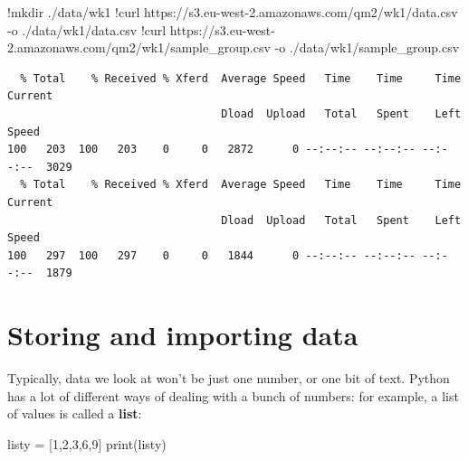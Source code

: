 \documentclass[
  letterpaper,
  DIV=11,
  numbers=noendperiod]{scrreprt}
\newenvironment{Shaded}{\begin{snugshade}}{\end{snugshade}}
\newcommand{\BuiltInTok}[1]{\textcolor[rgb]{0.00,0.23,0.31}{#1}}
\newcommand{\DecValTok}[1]{\textcolor[rgb]{0.68,0.00,0.00}{#1}}
\newcommand{\ErrorTok}[1]{\textcolor[rgb]{0.68,0.00,0.00}{#1}}
\newcommand{\FloatTok}[1]{\textcolor[rgb]{0.68,0.00,0.00}{#1}}
\newcommand{\NormalTok}[1]{\textcolor[rgb]{0.00,0.23,0.31}{#1}}
\newcommand{\OperatorTok}[1]{\textcolor[rgb]{0.37,0.37,0.37}{#1}}
\begin{document}
\begin{Shaded}
\begin{Highlighting}[]
\OperatorTok{!}\NormalTok{mkdir .}\OperatorTok{/}\NormalTok{data}\OperatorTok{/}\NormalTok{wk1}
\OperatorTok{!}\NormalTok{curl https:}\OperatorTok{//}\NormalTok{s3.eu}\OperatorTok{{-}}\NormalTok{west}\OperatorTok{{-}}\FloatTok{2.}\ErrorTok{amazonaws}\NormalTok{.com}\OperatorTok{/}\NormalTok{qm2}\OperatorTok{/}\NormalTok{wk1}\OperatorTok{/}\NormalTok{data.csv }\OperatorTok{{-}}\NormalTok{o .}\OperatorTok{/}\NormalTok{data}\OperatorTok{/}\NormalTok{wk1}\OperatorTok{/}\NormalTok{data.csv}
\OperatorTok{!}\NormalTok{curl https:}\OperatorTok{//}\NormalTok{s3.eu}\OperatorTok{{-}}\NormalTok{west}\OperatorTok{{-}}\FloatTok{2.}\ErrorTok{amazonaws}\NormalTok{.com}\OperatorTok{/}\NormalTok{qm2}\OperatorTok{/}\NormalTok{wk1}\OperatorTok{/}\NormalTok{sample\_group.csv }\OperatorTok{{-}}\NormalTok{o .}\OperatorTok{/}\NormalTok{data}\OperatorTok{/}\NormalTok{wk1}\OperatorTok{/}\NormalTok{sample\_group.csv}
\end{Highlighting}
\end{Shaded}

\begin{verbatim}
  % Total    % Received % Xferd  Average Speed   Time    Time     Time  Current
                                 Dload  Upload   Total   Spent    Left  Speed
100   203  100   203    0     0   2872      0 --:--:-- --:--:-- --:--:--  3029
  % Total    % Received % Xferd  Average Speed   Time    Time     Time  Current
                                 Dload  Upload   Total   Spent    Left  Speed
100   297  100   297    0     0   1844      0 --:--:-- --:--:-- --:--:--  1879
\end{verbatim}

\hypertarget{storing-and-importing-data}{%
\section{Storing and importing data}\label{storing-and-importing-data}}

Typically, data we look at won't be just one number, or one bit of text.
Python has a lot of different ways of dealing with a bunch of numbers:
for example, a list of values is called a \textbf{list}:

\begin{Shaded}
\begin{Highlighting}[]
\NormalTok{listy }\OperatorTok{=}\NormalTok{ [}\DecValTok{1}\NormalTok{,}\DecValTok{2}\NormalTok{,}\DecValTok{3}\NormalTok{,}\DecValTok{6}\NormalTok{,}\DecValTok{9}\NormalTok{]}
\BuiltInTok{print}\NormalTok{(listy)}
\end{Highlighting}
\end{Shaded}
\end{document}
